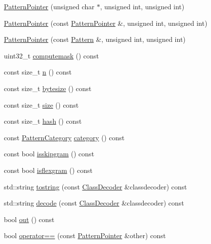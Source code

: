 \begin{DoxyCompactItemize}
\item 
\hyperlink{classPatternPointer_aaff11689a322a10b794b6b24a7729370}{Pattern\+Pointer} (unsigned char $\ast$, unsigned int, unsigned int)
\item 
\hyperlink{classPatternPointer_a52b3b7683e06bc50ed070e691599c8e6}{Pattern\+Pointer} (const \hyperlink{classPatternPointer}{Pattern\+Pointer} \&, unsigned int, unsigned int)
\item 
\hyperlink{classPatternPointer_a3a087008261f7c88a5603c77a8feb995}{Pattern\+Pointer} (const \hyperlink{classPattern}{Pattern} \&, unsigned int, unsigned int)
\item 
uint32\+\_\+t \hyperlink{classPatternPointer_ac1245e58c40f3ee9c1202ce922493b86}{computemask} () const 
\item 
const size\+\_\+t \hyperlink{classPatternPointer_a557d9f27ecad057a8942770313c22e42}{n} () const 
\item 
const size\+\_\+t \hyperlink{classPatternPointer_a8a204b408ed1cccc3b0c89183e818210}{bytesize} () const 
\item 
const size\+\_\+t \hyperlink{classPatternPointer_a2c8bab975c7234c935f7992701b897b9}{size} () const 
\item 
const size\+\_\+t \hyperlink{classPatternPointer_a3cb1a416e1824414406ec3d4b804b0c3}{hash} () const 
\item 
const \hyperlink{pattern_8h_a17879f85ec892834fb691c61e71dfe54}{Pattern\+Category} \hyperlink{classPatternPointer_aab5856a3a8e1ae58c7446b631142503e}{category} () const 
\item 
const bool \hyperlink{classPatternPointer_a4efd42523605481c0dc56d59e370cec3}{isskipgram} () const 
\item 
const bool \hyperlink{classPatternPointer_a345e4adac1ad1698e5964229feb1368c}{isflexgram} () const 
\item 
std\+::string \hyperlink{classPatternPointer_ab17b7641c0651d2879bfe320826492e7}{tostring} (const \hyperlink{classClassDecoder}{Class\+Decoder} \&classdecoder) const 
\item 
std\+::string \hyperlink{classPatternPointer_ac35cb0151096929cd0054f77110e1afe}{decode} (const \hyperlink{classClassDecoder}{Class\+Decoder} \&classdecoder) const 
\item 
bool \hyperlink{classPatternPointer_a281b6877995271a87cf561c450c4421b}{out} () const 
\item 
bool \hyperlink{classPatternPointer_a70e5e8f505fe4b136f37ab6e19ffc1c7}{operator==} (const \hyperlink{classPatternPointer}{Pattern\+Pointer} \&other) const 

\end{DoxyCompactItemize}
